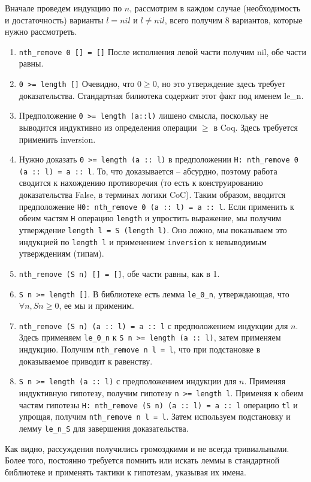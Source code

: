 Вначале проведем индукцию по $n$, рассмотрим в каждом случае (необходимость и достаточность) варианты $l = nil$ и $l \neq nil$, всего получим 8 вариантов, которые нужно рассмотреть.
\begin{enumerate}
\item \texttt{nth\_remove 0 [] = []} После исполнения левой части получим nil, обе части равны.
\item \texttt{0 >= length []} Очевидно, что $0 \geq 0$, но это утверждение здесь требует доказательства. Стандартная билиотека содержит этот факт под именем le\_n.
\item Предположение \texttt{0 >= length (a::l)} лишено смысла, поскольку не выводится индуктивно из определения операции $\geq$ в Coq. Здесь требуется применить inversion.
\item Нужно доказать \texttt{0 >= length (a :: l)} в предположении \texttt{H: nth\_remove 0 (a :: l) = a :: l}. То, что доказывается -- абсурдно, поэтому работа сводится к нахождению противоречия (то есть к конструированию доказательства False, в терминах логики CoC). Таким образом, вводится предположение \texttt{H0: nth\_remove 0 (a :: l) = a :: l}. Если применить к обеим частям \texttt{H} операцию \texttt{length} и упростить выражение, мы получим утверждение \texttt{length l = S (length l)}. Оно ложно, мы показываем это индукцией по \texttt{length l} и применением \texttt{inversion} к невыводимым утверждениям (типам).
\item \texttt{nth\_remove (S n) [] = []}, обе части равны, как в 1.
\item \texttt{S n >= length []}. В библиотеке есть лемма \texttt{le\_0\_n}, утверждающая, что $\forall n, S n \geq 0$, ее мы и применим.
\item \texttt{nth\_remove (S n) (a :: l) = a :: l} с предположением индукции для $n$. Здесь применяем \texttt{le\_0\_n} к \texttt{S n >= length (a :: l)}, затем применяем индукцию. Получим \texttt{nth\_remove n l = l}, что при подстановке в доказываемое приводит к равенству.
\item \texttt{S n >= length (a :: l)} с предположением индукции для $n$. Применяя индуктивную гипотезу, получим гипотезу \texttt{n >= length l}. Применяя к обеим частям гипотезы \texttt{H: nth\_remove (S n) (a :: l) = a :: l} операцию \texttt{tl} и упрощая, получим \texttt{nth\_remove n l = l}. Затем используем подстановку и лемму \texttt{le\_n\_S} для завершения доказательства.
\end{enumerate}

Как видно, рассуждения получились громоздкими и не всегда тривиальными. Более того, постоянно требуется помнить или искать леммы в стандартной библиотеке и применять тактики к гипотезам, указывая их имена.


